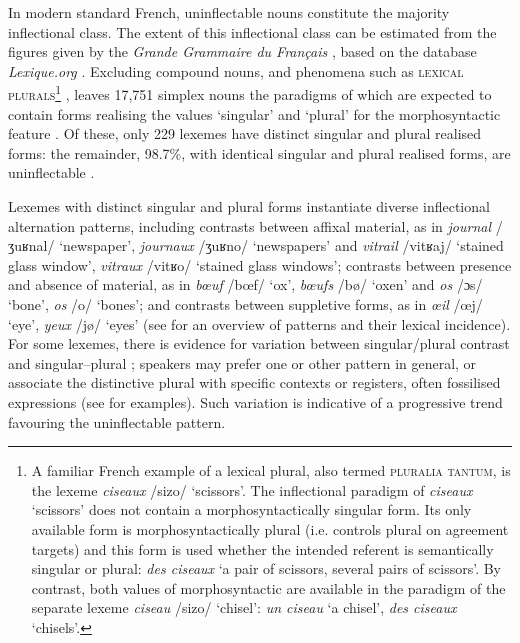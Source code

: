 \documentclass[output=paper,colorlinks,citecolor=brown]{langscibook}
\begin{document}
In modern standard French, uninflectable nouns constitute the majority inflectional class. The extent of this inflectional class can be estimated from the figures given by the \emph{Grande Grammaire du Français} \citep{abeillegodard2021}, based on the database \emph{Lexique.org} \citep{new2004}. Excluding compound nouns, and phenomena such as \textsc{lexical plurals}\footnote{A familiar French example of a lexical plural, also termed \textsc{pluralia tantum}, is the lexeme \emph{ciseaux} /sizo/ `scissors'. The inflectional paradigm of \emph{ciseaux} `scissors' does not contain a morphosyntactically singular form. Its only available form is morphosyntactically plural (i.e. controls plural on agreement targets) and this form is used	whether the intended referent is semantically singular or plural: \emph{des ciseaux} `a pair of scissors, several pairs of scissors'. By contrast, both values of morphosyntactic  are available in the	paradigm of the separate lexeme \emph{ciseau} /sizo/ `chisel': \emph{un ciseau} `a chisel', \emph{des ciseaux} `chisels'.} \citep{acquaviva2008}, leaves 17,751 simplex nouns the paradigms of which are expected to contain forms realising the values `singular' and `plural' for the morphosyntactic feature \textsc{}. Of these, only 229 lexemes have distinct singular and plural realised forms: the remainder, 98.7\%, with identical singular and plural realised forms, are uninflectable \citep{abeillegodardjonassonmelismouretnoaillysimatos2021}.

Lexemes with distinct singular and plural forms instantiate diverse inflectional alternation patterns, including contrasts between affixal material, as in \emph{journal} /ʒuʁnal/ `newspaper', \emph{journaux} /ʒuʁno/ `newspapers' and \emph{vitrail} /vitʁaj/ `stained glass window', \emph{vitraux} /vitʁo/ `stained glass windows'; contrasts between presence and absence of material, as in \emph{bœuf} /bœf/ `ox', \emph{bœufs} /bø/ `oxen' and \emph{os} /ɔs/ `bone', \emph{os} /o/ `bones'; and contrasts between suppletive forms, as in \emph{œil} /œj/ `eye', \emph{yeux} /jø/ `eyes' (see \citealt{abeillegodardjonassonmelismouretnoaillysimatos2021} for an overview of patterns and their lexical incidence). For some lexemes, there is evidence for variation between singular/plural contrast and singular--plural ; speakers may prefer one or other pattern in general, or associate the distinctive plural with specific contexts or registers, often fossilised expressions (see \citealt{abeillegodardjonassonmelismouretnoaillysimatos2021} for examples). Such variation is indicative of a progressive trend favouring the uninflectable pattern.
\end{document}
